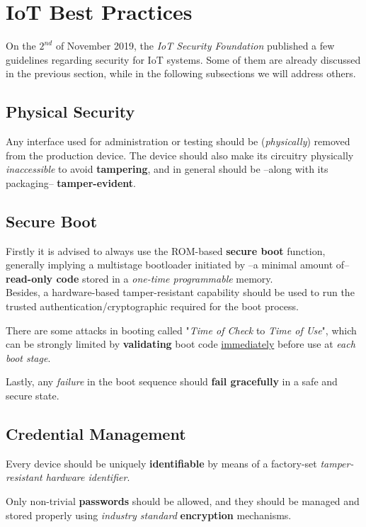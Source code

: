 \section{IoT Best Practices}
On the $2^{nd}$ of November 2019,
the \textit{IoT Security Foundation} published a few guidelines regarding security for IoT systems.
Some of them are already discussed in the previous section, while in the following subsections we will address others.
\subsection{Physical Security}

Any interface used for administration  or testing should be (\textit{physically}) removed from the production device. 
The device should also make its circuitry physically \textit{inaccessible} to avoid \textbf{tampering},
and in general should be {--}along with its packaging{--} \textbf{tamper-evident}.  

\subsection{Secure Boot}
Firstly it is advised to always use the ROM-based \textbf{secure boot} function, generally implying a multistage bootloader initiated by {--}a minimal amount of{--} \textbf{read-only code} stored in a \textit{one-time programmable} memory.\\
Besides, a hardware-based tamper-resistant capability should be used to run the trusted authentication/cryptographic required for the boot process.

There are some attacks in booting called "\textit{Time of Check} to \textit{Time of Use}", which can be strongly limited by \textbf{validating} boot code \underline{immediately} before use at \textit{each boot stage}.

Lastly, any \textit{failure} in the boot sequence should \textbf{fail gracefully} in a safe and secure state.

\subsection{Credential Management}
Every device should be uniquely \textbf{identifiable} by means of a factory-set \textit{tamper-resistant hardware identifier}.

Only non-trivial \textbf{passwords} should be allowed, and they should be managed and stored properly using \textit{industry standard} \textbf{encryption} mechanisms.

